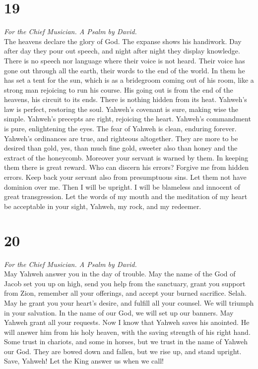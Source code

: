 \hypertarget{section-18}{%
\section{19}\label{section-18}}

\emph{For the Chief Musician. A Psalm by David.}\\
 The heavens declare the glory of God. The expanse shows
his handiwork.  Day after day they pour out speech, and
night after night they display knowledge.  There is no
speech nor language where their voice is not heard.  Their
voice has gone out through all the earth, their words to the end of the
world. In them he has set a tent for the sun,  which is as
a bridegroom coming out of his room, like a strong man rejoicing to run
his course.  His going out is from the end of the heavens,
his circuit to its ends. There is nothing hidden from its heat.
 Yahweh's law is perfect, restoring the soul. Yahweh's
covenant is sure, making wise the simple.  Yahweh's
precepts are right, rejoicing the heart. Yahweh's commandment is pure,
enlightening the eyes.  The fear of Yahweh is clean,
enduring forever. Yahweh's ordinances are true, and righteous
altogether.  They are more to be desired than gold, yes,
than much fine gold, sweeter also than honey and the extract of the
honeycomb.  Moreover your servant is warned by them. In
keeping them there is great reward.  Who can discern his
errors? Forgive me from hidden errors.  Keep back your
servant also from presumptuous sins. Let them not have dominion over me.
Then I will be upright. I will be blameless and innocent of great
transgression.  Let the words of my mouth and the
meditation of my heart be acceptable in your sight, Yahweh, my rock, and
my redeemer.

\hypertarget{section-19}{%
\section{20}\label{section-19}}

\emph{For the Chief Musician. A Psalm by David.}\\
 May Yahweh answer you in the day of trouble. May the name
of the God of Jacob set you up on high,  send you help
from the sanctuary, grant you support from Zion,  remember
all your offerings, and accept your burned sacrifice. Selah.
 May he grant you your heart's desire, and fulfill all
your counsel.  We will triumph in your salvation. In the
name of our God, we will set up our banners. May Yahweh grant all your
requests.  Now I know that Yahweh saves his anointed. He
will answer him from his holy heaven, with the saving strength of his
right hand.  Some trust in chariots, and some in horses,
but we trust in the name of Yahweh our God.  They are
bowed down and fallen, but we rise up, and stand upright. 
Save, Yahweh! Let the King answer us when we call!

